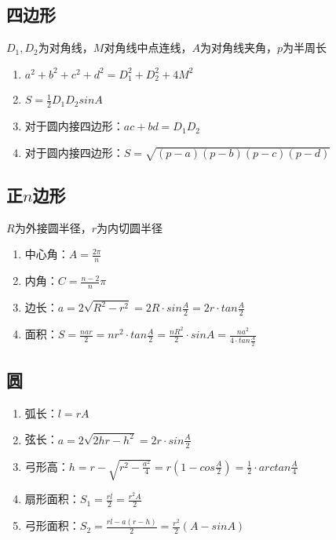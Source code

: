 \begin{spacing}{0.1}
\subsection*{四边形}
\begin{spacing}{0.1}
	$D_1, D_2$为对角线，$M$对角线中点连线，$A$为对角线夹角，$p$为半周长
	\begin{enumerate}
		\item $a^2+b^2+c^2+d^2=D_1^2+D_2^2+4M^2$
		\item $S=\frac{1}{2}D_1D_2sinA$
		\item 对于圆内接四边形：$\displaystyle ac+bd=D_1D_2$
		\item 对于圆内接四边形：$\displaystyle S=\sqrt{(p-a)(p-b)(p-c)(p-d)}$
	\end{enumerate}
\end{spacing}
\subsection*{正$n$边形}
\begin{spacing}{0.1}
	$R$为外接圆半径，$r$为内切圆半径
	\begin{enumerate}
		\item 中心角：$\displaystyle A=\frac{2\pi}{n}$
		\item 内角：$\displaystyle C=\frac{n-2}{n}\pi$
		\item 边长：$\displaystyle a=2\sqrt{R^2-r^2}=2R \cdot sin\frac{A}{2}=2r \cdot tan\frac{A}{2}$
		\item 面积：$\displaystyle S=\frac{nar}{2}=nr^2 \cdot tan\frac{A}{2}=\frac{nR^2}{2} \cdot sinA=\frac{na^2}{4 \cdot tan\frac{A}{2}}$
	\end{enumerate}
\end{spacing}
\subsection*{圆}
\begin{spacing}{0.1}
	\begin{enumerate}
		\item 弧长：$\displaystyle l=rA$
		\item 弦长：$\displaystyle a=2\sqrt{2hr-h^2}=2r\cdot sin\frac{A}{2}$
		\item 弓形高：$\displaystyle h=r-\sqrt{r^2-\frac{a^2}{4}}=r(1-cos\frac{A}{2})=\frac{1}{2} \cdot arctan\frac{A}{4}$
		\item 扇形面积：$\displaystyle S_1=\frac{rl}{2}=\frac{r^2A}{2}$
		\item 弓形面积：$\displaystyle S_2=\frac{rl-a(r-h)}{2}=\frac{r^2}{2}(A-sinA)$
	\end{enumerate}
\end{spacing}

\end{spacing}
